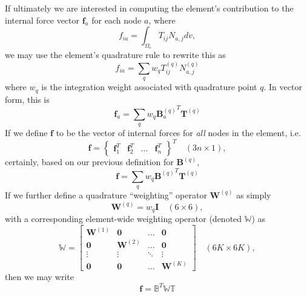 \documentclass[11pt]{article} %
\begin{document}
If ultimately we are interested in computing the element's contribution to the internal force vector $\mathbf{f}_a$ for each node $a$, where
\begin{equation}
	f_{ia} = \int_{\Omega_e} T_{ij} N_{a,j} dv,
\end{equation}
we may use the element's quadrature rule to rewrite this as
\begin{equation}
	f_{ia} = \sum_q w_q T^{(q)}_{ij} N^{(q)}_{a,j}
\end{equation}
where $w_q$ is the integration weight associated with quadrature point $q$. In vector form, this is
\begin{equation}
	\mathbf{f}_a = \sum_q w_q {\mathbf{B}_a^{(q)}}^T \mathbf{T}^{(q)}
\end{equation}
If we define $\mathbf{f}$ to be the vector of internal forces for \textit{all} nodes in the element, i.e.
\begin{equation}
	\mathbf{f} = \left\{ \begin{array}{cccc} \mathbf{f}_1^T & \mathbf{f}_2^T & \ldots & \mathbf{f}_n^T \end{array} \right\}^T \quad (3n \times 1),
\end{equation}
certainly, based on our previous definition for $\mathbf{B}^{(q)}$,
\begin{equation}
	\mathbf{f} = \sum_q w_q {\mathbf{B}^{(q)}}^T \mathbf{T}^{(q)}
\end{equation}
If we further define a quadrature ``weighting'' operator $\mathbf{W}^{(q)}$ as simply
\begin{equation}
	\mathbf{W}^{(q)} = w_q \mathbf{I} \quad (6 \times 6),
\end{equation}
with a corresponding element-wide weighting operator (denoted $\mathbb{W}$) as
\begin{equation}
	\mathbb{W} = \left[ \begin{array}{cccc} \mathbf{W}^{(1)} & \mathbf{0} & \ldots & \mathbf{0} \\ \mathbf{0} & \mathbf{W}^{(2)} & \ldots & \mathbf{0} \\ \vdots & \vdots & \ddots & \vdots \\ \mathbf{0} & \mathbf{0} & \ldots & \mathbf{W}^{(K)} \end{array} \right] \quad (6K \times 6K),
\end{equation}
then we may write
\begin{equation}
	\mathbf{f} = \mathbb{B}^T \mathbb{W} \mathbb{T}
\end{equation}
\end{document}
